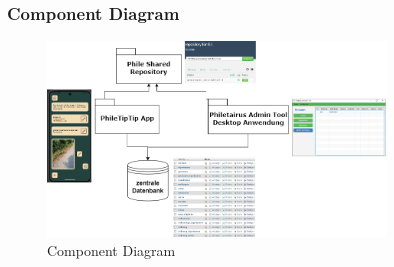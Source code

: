 \begin{frame}
\frametitle{Component Diagram}

\begin{figure}
  \includegraphics[width=0.8\textwidth]{figures/Component_Diagramm.drawio.png}
  \caption{Component Diagram}
  \label{fig:component}
\end{figure}

\end{frame}





